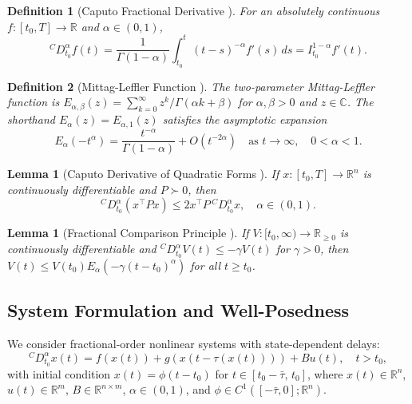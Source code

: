 \documentclass[12pt,a4paper]{article}
\newtheorem{lemma}[theorem]{Lemma}
\newtheorem{definition}{Definition}
\begin{document}
\begin{definition}[Caputo Fractional Derivative \cite{podlubny1999}]
For an absolutely continuous $f: [t_0, T] \to \mathbb{R}$ and $\alpha \in (0,1)$,
\begin{equation}
    {}^{C}\!D^{\alpha}_{t_0} f(t) = \frac{1}{\Gamma(1-\alpha)} \int_{t_0}^{t} (t-s)^{-\alpha} f'(s) \, ds = I^{1-\alpha}_{t_0} f'(t).
\end{equation}
\end{definition}

\begin{definition}[Mittag-Leffler Function \cite{gorenflo2014}]
The two-parameter Mittag-Leffler function is $E_{\alpha,\beta}(z) = \sum_{k=0}^{\infty} z^k / \Gamma(\alpha k + \beta)$ for $\alpha, \beta > 0$ and $z \in \mathbb{C}$. The shorthand $E_{\alpha}(z) = E_{\alpha,1}(z)$ satisfies the asymptotic expansion
\begin{equation}
\label{eq:ml_asymptotic}
    E_{\alpha}(-t^{\alpha}) = \frac{t^{-\alpha}}{\Gamma(1-\alpha)} + O(t^{-2\alpha}) \quad \text{as } t \to \infty, \quad 0 < \alpha < 1.
\end{equation}
\end{definition}

\begin{lemma}[Caputo Derivative of Quadratic Forms {\cite{aguila2014}}]
\label{lem:caputo_inequality}
If $x: [t_0, T] \to \mathbb{R}^n$ is continuously differentiable and $P \succ 0$, then
\begin{equation}
    {}^{C}\!D^{\alpha}_{t_0} \!\left( x^{\!\top}\! P x \right) \leq 2 x^{\!\top} P \, {}^{C}\!D^{\alpha}_{t_0} x, \quad \alpha \in (0,1).
\end{equation}
\end{lemma}

\begin{lemma}[Fractional Comparison Principle {\cite{li2010}}]
\label{lem:comparison}
If $V: [t_0, \infty) \to \mathbb{R}_{\geq 0}$ is continuously differentiable and ${}^{C}\!D^{\alpha}_{t_0} V(t) \leq -\gamma V(t)$ for $\gamma > 0$, then $V(t) \leq V(t_0) E_{\alpha}(-\gamma (t-t_0)^{\alpha})$ for all $t \geq t_0$.
\end{lemma}

\subsection{System Formulation and Well-Posedness}

We consider fractional-order nonlinear systems with state-dependent delays:
\begin{equation}
\label{eq:system}
    {}^{C}\!D^{\alpha}_{t_0} x(t) = f(x(t)) + g(x(t-\tau(x(t)))) + B u(t), \quad t > t_0,
\end{equation}
with initial condition $x(t) = \phi(t-t_0)$ for $t \in [t_0 - \bar{\tau},\, t_0]$, where $x(t) \in \mathbb{R}^n$, $u(t) \in \mathbb{R}^m$, $B \in \mathbb{R}^{n \times m}$, $\alpha \in (0,1)$, and $\phi \in C^1([-\bar{\tau}, 0]; \mathbb{R}^n)$.
\end{document}
